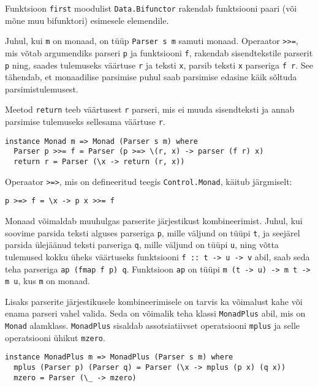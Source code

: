 \documentclass[12pt]{article}
\begin{document}
        Funktsioon \verb!first! moodulist \verb!Data.Bifunctor! rakendab funktsiooni paari (või mõne muu bifunktori) esimesele elemendile.

        Juhul, kui \verb!m! on monaad, on tüüp \verb!Parser s m! samuti monaad. Operaator \verb!>>=!, mis võtab argumendiks parseri \verb!p! ja funktsiooni \verb!f!, rakendab sisendtekstile parserit \verb!p! ning, saades tulemuseks väärtuse \verb!r! ja teksti \verb!x!, parsib teksti \verb!x! parseriga \verb!f r!. See tähendab, et monaadilise parsimise puhul saab parsimise edasine käik sõltuda parsimistulemusest.

        Meetod \verb!return! teeb väärtusest \verb!r! parseri, mis ei muuda sisendteksti ja annab parsimise tulemuseks sellesama väärtuse \verb!r!.

        \begin{verbatim}instance Monad m => Monad (Parser s m) where
  Parser p >>= f = Parser (p >=> \(r, x) -> parser (f r) x)
  return r = Parser (\x -> return (r, x))\end{verbatim}

        Operaator \verb!>=>!, mis on defineeritud teegis \verb!Control.Monad!, käitub järgmiselt:

        \begin{verbatim}p >=> f = \x -> p x >>= f\end{verbatim}

        Monaad võimaldab muuhulgas parserite järjestikust kombineerimist. Juhul, kui soovime parsida teksti alguses parseriga \verb!p!, mille väljund on tüüpi \verb!t!, ja seejärel parsida ülejäänud teksti parseriga \verb!q!, mille väljund on tüüpi \verb!u!, ning võtta tulemused kokku üheks väärtuseks funktsiooni \verb!f :: t -> u -> v! abil, saab seda teha parseriga \verb!ap (fmap f p) q!. Funktsioon \verb!ap! on tüüpi \verb!m (t -> u) -> m t -> m u!, kus \verb!m! on monaad. 

        Lisaks parserite järjestikusele kombineerimisele on tarvis ka võimalust kahe või enama parseri vahel valida. Seda on võimalik teha klassi \verb!MonadPlus! abil, mis on \verb!Monad! alamklass. \verb!MonadPlus! sisaldab assotsiatiivset operatsiooni \verb!mplus! ja selle operatsiooni ühikut \verb!mzero!.

        \begin{verbatim}instance MonadPlus m => MonadPlus (Parser s m) where
  mplus (Parser p) (Parser q) = Parser (\x -> mplus (p x) (q x))
  mzero = Parser (\_ -> mzero)\end{verbatim}
\end{document}
